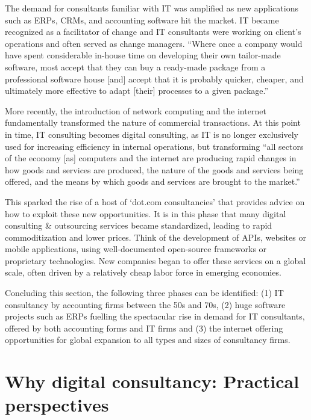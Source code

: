 \documentclass[12pt]{article}
\begin{document}
The demand for consultants familiar with IT was amplified as new
applications such as ERPs, CRMs, and accounting software hit the market.
IT became recognized as a facilitator of change and IT consultants were
working on client's operations and often served as change managers.
``Where once a company would have spent considerable in-house time on
developing their own tailor-made software, most accept that they can buy
a ready-made package from a professional software house {[}and{]} accept
that it is probably quicker, cheaper, and ultimately more effective to
adapt {[}their{]} processes to a given package.'' \citep[
23]{czerniawska1999}

More recently, the introduction of network computing and the internet
fundamentally transformed the nature of commercial transactions. At this
point in time, IT consulting becomes digital consulting, as IT is no
longer exclusively used for increasing efficiency in internal
operations, but transforming ``all sectors of the economy {[}as{]}
computers and the internet are producing rapid changes in how goods and
services are produced, the nature of the goods and services being
offered, and the means by which goods and services are brought to the
market.'' \citep[ 2-14]{brynjolfsson2000}

This sparked the rise of a host of `dot.com consultancies' that provides
advice on how to exploit these new opportunities. It is in this phase
that many digital consulting \& outsourcing services became
standardized, leading to rapid commoditization and lower prices. Think
of the development of APIs, websites or mobile applications, using
well-documented open-source frameworks or proprietary technologies. New
companies began to offer these services on a global scale, often driven
by a relatively cheap labor force in emerging economies.

Concluding this section, the following three phases can be identified:
(1) IT consultancy by accounting firms between the 50s and 70s, (2) huge
software projects such as ERPs fuelling the spectacular rise in demand
for IT consultants, offered by both accounting forms and IT firms and
(3) the internet offering opportunities for global expansion to all
types and sizes of consultancy firms.

\section{Why digital consultancy: Practical
perspectives}\label{why-digital-consultancy-practical-perspectives}
\end{document}
